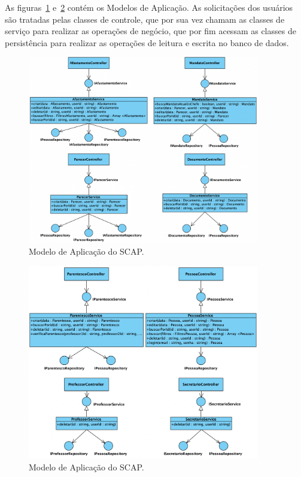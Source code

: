 As figuras~\ref{fig-modelo-aplicacao-1} e~\ref{fig-modelo-aplicacao-2} contém os Modelos de Aplicação.
As solicitações dos usuários são tratadas pelas classes de controle, que por sua vez
chamam as classes de serviço para realizar as operações de negócio, que por fim acessam
as classes de persistência para realizar as operações de leitura e escrita no banco de dados.


\begin{figure}[h!]
    \centering
    \includegraphics[width=0.9\textwidth]{figuras/fig-modelo-apl-1.png}
    \caption{Modelo de Aplicação do SCAP.}
    \label{fig-modelo-aplicacao-1}
\end{figure}


\begin{figure}[h!]
    \centering
    \includegraphics[width=0.9\textwidth]{figuras/fig-modelo-apl-2.png}
    \caption{Modelo de Aplicação do SCAP.}
    \label{fig-modelo-aplicacao-2}
\end{figure}

